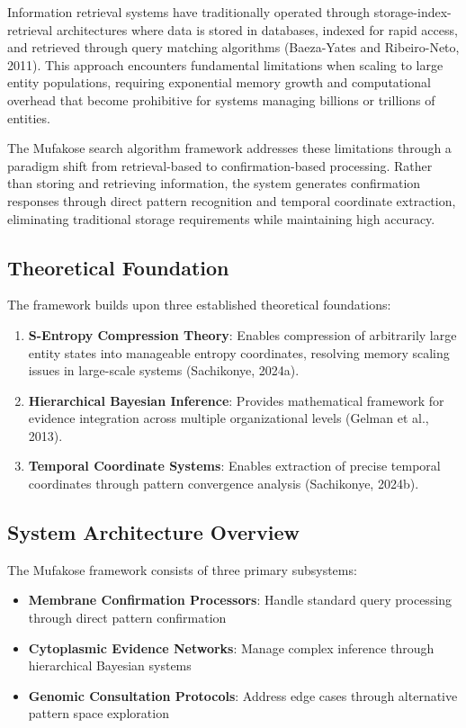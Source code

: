 \documentclass[12pt,a4paper]{article}
\begin{document}
Information retrieval systems have traditionally operated through storage-index-retrieval architectures where data is stored in databases, indexed for rapid access, and retrieved through query matching algorithms (Baeza-Yates and Ribeiro-Neto, 2011). This approach encounters fundamental limitations when scaling to large entity populations, requiring exponential memory growth and computational overhead that become prohibitive for systems managing billions or trillions of entities.

The Mufakose search algorithm framework addresses these limitations through a paradigm shift from retrieval-based to confirmation-based processing. Rather than storing and retrieving information, the system generates confirmation responses through direct pattern recognition and temporal coordinate extraction, eliminating traditional storage requirements while maintaining high accuracy.

\subsection{Theoretical Foundation}

The framework builds upon three established theoretical foundations:

\begin{enumerate}
\item \textbf{S-Entropy Compression Theory}: Enables compression of arbitrarily large entity states into manageable entropy coordinates, resolving memory scaling issues in large-scale systems (Sachikonye, 2024a).
\item \textbf{Hierarchical Bayesian Inference}: Provides mathematical framework for evidence integration across multiple organizational levels (Gelman et al., 2013).
\item \textbf{Temporal Coordinate Systems}: Enables extraction of precise temporal coordinates through pattern convergence analysis (Sachikonye, 2024b).
\end{enumerate}

\subsection{System Architecture Overview}

The Mufakose framework consists of three primary subsystems:

\begin{itemize}
\item \textbf{Membrane Confirmation Processors}: Handle standard query processing through direct pattern confirmation
\item \textbf{Cytoplasmic Evidence Networks}: Manage complex inference through hierarchical Bayesian systems
\item \textbf{Genomic Consultation Protocols}: Address edge cases through alternative pattern space exploration
\end{itemize}
\end{document}
